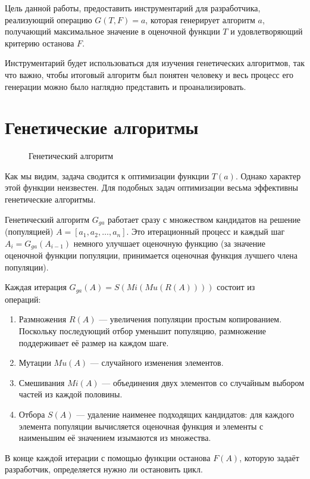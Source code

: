 \documentclass[utf8,a5paper,portrait,10pt]{eskdtext}
\begin{document}
Цель данной работы, предоставить инструментарий для разработчика, реализующий
операцию $G(T, F) = a$, которая генерирует алгоритм $a$, получающий максимальное
значение в оценочной функции $T$ и удовлетворяющий критерию останова $F$.

Инструментарий будет использоваться для изучения генетических алгоритмов, так
что важно, чтобы итоговый алгоритм был понятен человеку и весь процесс его
генерации можно было наглядно представить и проанализировать.

\newpage
\section{Генетические алгоритмы}

\begin{figure}
  \centering
  
  \caption{Генетический алгоритм}
\end{figure}

Как мы видим, задача сводится к оптимизации функции $T(a)$. Однако характер этой
функции неизвестен. Для подобных задач оптимизации весьма эффективны
генетические алгоритмы.\cite{reinforcement}

Генетический алгоритм $G_{ga}$ работает сразу с множеством кандидатов на решение
(популяцией) $A = [a_1, a_2, …, a_n]$. Это итерационный процесс и каждый шаг
$A_i = G_{ga}(A_{i-1})$ немного улучшает оценочную функцию (за значение
оценочной функции популяции, принимается оценочная функция лучшего члена
популяции).

Каждая итерация $G_{ga}(A) = S(Mi(Mu(R(A))))$ состоит из\\
операций:\cite{reinforcement}
\begin{enumerate}
  \item Размножения $R(A)$ — увеличения популяции простым копированием.
        Поскольку последующий отбор уменьшит популяцию, размножение поддерживает
        её размер на каждом шаге.
  \item Мутации $Mu(A)$ — случайного изменения элементов.
  \item Смешивания $Mi(A)$ — объединения двух элементов со случайным выбором
        частей из каждой половины.
  \item Отбора $S(A)$ — удаление наименее подходящих кандидатов: для каждого
        элемента популяции вычисляется оценочная функция и элементы с
        наименьшим её значением изымаются из множества.
\end{enumerate}

В конце каждой итерации с помощью функции останова $F(A)$, которую задаёт
разработчик, определяется нужно ли остановить цикл.
\end{document}
